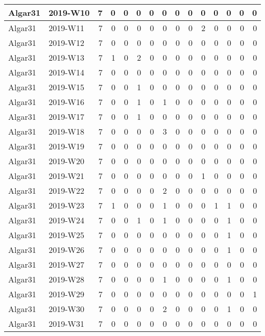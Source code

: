 \documentclass[]{book}
\begin{document}
\begin{table}
\begin{tabular}[t]{l|l|r|r|r|r|r|r|r|r|r|r|r|r|r}
\hline
Algar31 & 2019-W10 & 7 & 0 & 0 & 0 & 0 & 0 & 0 & 0 & 0 & 0 & 0 & 0 & 0\\
\hline
Algar31 & 2019-W11 & 7 & 0 & 0 & 0 & 0 & 0 & 0 & 0 & 2 & 0 & 0 & 0 & 0\\
\hline
Algar31 & 2019-W12 & 7 & 0 & 0 & 0 & 0 & 0 & 0 & 0 & 0 & 0 & 0 & 0 & 0\\
\hline
Algar31 & 2019-W13 & 7 & 1 & 0 & 2 & 0 & 0 & 0 & 0 & 0 & 0 & 0 & 0 & 0\\
\hline
Algar31 & 2019-W14 & 7 & 0 & 0 & 0 & 0 & 0 & 0 & 0 & 0 & 0 & 0 & 0 & 0\\
\hline
Algar31 & 2019-W15 & 7 & 0 & 0 & 1 & 0 & 0 & 0 & 0 & 0 & 0 & 0 & 0 & 0\\
\hline
Algar31 & 2019-W16 & 7 & 0 & 0 & 1 & 0 & 1 & 0 & 0 & 0 & 0 & 0 & 0 & 0\\
\hline
Algar31 & 2019-W17 & 7 & 0 & 0 & 1 & 0 & 0 & 0 & 0 & 0 & 0 & 0 & 0 & 0\\
\hline
Algar31 & 2019-W18 & 7 & 0 & 0 & 0 & 0 & 3 & 0 & 0 & 0 & 0 & 0 & 0 & 0\\
\hline
Algar31 & 2019-W19 & 7 & 0 & 0 & 0 & 0 & 0 & 0 & 0 & 0 & 0 & 0 & 0 & 0\\
\hline
Algar31 & 2019-W20 & 7 & 0 & 0 & 0 & 0 & 0 & 0 & 0 & 0 & 0 & 0 & 0 & 0\\
\hline
Algar31 & 2019-W21 & 7 & 0 & 0 & 0 & 0 & 0 & 0 & 0 & 1 & 0 & 0 & 0 & 0\\
\hline
Algar31 & 2019-W22 & 7 & 0 & 0 & 0 & 0 & 2 & 0 & 0 & 0 & 0 & 0 & 0 & 0\\
\hline
Algar31 & 2019-W23 & 7 & 1 & 0 & 0 & 0 & 1 & 0 & 0 & 0 & 1 & 1 & 0 & 0\\
\hline
Algar31 & 2019-W24 & 7 & 0 & 0 & 1 & 0 & 1 & 0 & 0 & 0 & 0 & 1 & 0 & 0\\
\hline
Algar31 & 2019-W25 & 7 & 0 & 0 & 0 & 0 & 0 & 0 & 0 & 0 & 0 & 1 & 0 & 0\\
\hline
Algar31 & 2019-W26 & 7 & 0 & 0 & 0 & 0 & 0 & 0 & 0 & 0 & 0 & 1 & 0 & 0\\
\hline
Algar31 & 2019-W27 & 7 & 0 & 0 & 0 & 0 & 0 & 0 & 0 & 0 & 0 & 0 & 0 & 0\\
\hline
Algar31 & 2019-W28 & 7 & 0 & 0 & 0 & 0 & 1 & 0 & 0 & 0 & 0 & 1 & 0 & 0\\
\hline
Algar31 & 2019-W29 & 7 & 0 & 0 & 0 & 0 & 0 & 0 & 0 & 0 & 0 & 0 & 0 & 1\\
\hline
Algar31 & 2019-W30 & 7 & 0 & 0 & 0 & 0 & 2 & 0 & 0 & 0 & 0 & 1 & 0 & 0\\
\hline
Algar31 & 2019-W31 & 7 & 0 & 0 & 0 & 0 & 0 & 0 & 0 & 0 & 0 & 0 & 0 & 0\\

\end{tabular}
\end{table}
\end{document}
